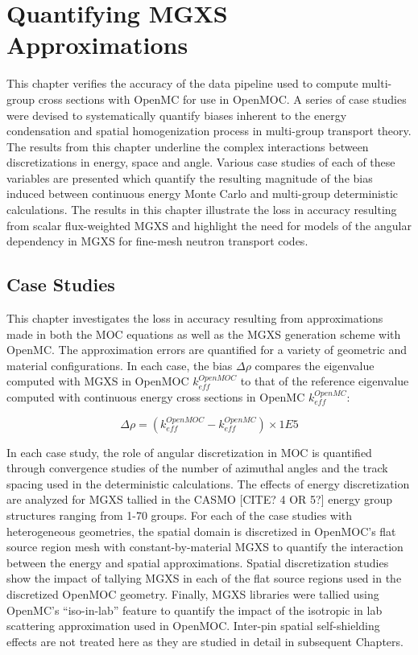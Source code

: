 \chapter{Quantifying MGXS Approximations}
\label{chap:biases}

This chapter verifies the accuracy of the data pipeline used to compute multi-group cross sections with OpenMC for use in OpenMOC. A series of case studies were devised to systematically quantify biases inherent to the energy condensation and spatial homogenization process in multi-group transport theory. The results from this chapter underline the complex interactions between discretizations in energy, space and angle. Various case studies of each of these variables are presented which quantify the resulting magnitude of the bias induced between continuous energy Monte Carlo and multi-group deterministic calculations. The results in this chapter illustrate the loss in accuracy resulting from scalar flux-weighted \ac{MGXS} and highlight the need for models of the angular dependency in \ac{MGXS} for fine-mesh neutron transport codes.


\section{Case Studies}
\label{sec:chap4-case-studies}

This chapter investigates the loss in accuracy resulting from approximations made in both the \ac{MOC} equations as well as the \ac{MGXS} generation scheme with OpenMC. The approximation errors are quantified for a variety of geometric and material configurations. In each case, the bias $\Delta\rho$ compares the eigenvalue computed with \ac{MGXS} in OpenMOC $k_{eff}^{OpenMOC}$ to that of the reference eigenvalue computed with continuous energy cross sections in OpenMC $k_{eff}^{OpenMC}$:

\begin{equation}
\label{eqn:chap4-delta-rho}
\Delta\rho = \left(k_{eff}^{OpenMOC} - k_{eff}^{OpenMC}\right) \times 1E5
\end{equation}

In each case study, the role of angular discretization in \ac{MOC} is quantified through convergence studies of the number of azimuthal angles and the track spacing used in the deterministic calculations. The effects of energy discretization are analyzed for \ac{MGXS} tallied in the CASMO [CITE? 4 OR 5?] energy group structures ranging from 1-70 groups. For each of the case studies with heterogeneous geometries, the spatial domain is discretized in OpenMOC's flat source region mesh with constant-by-material \ac{MGXS} to quantify the interaction between the energy and spatial approximations. Spatial discretization studies show the impact of tallying \ac{MGXS} in each of the flat source regions used in the discretized OpenMOC geometry. Finally, \ac{MGXS} libraries were tallied using OpenMC's ``iso-in-lab'' feature to quantify the impact of the isotropic in lab scattering approximation used in OpenMOC. Inter-pin spatial self-shielding effects are not treated here as they are studied in detail in subsequent Chapters.

